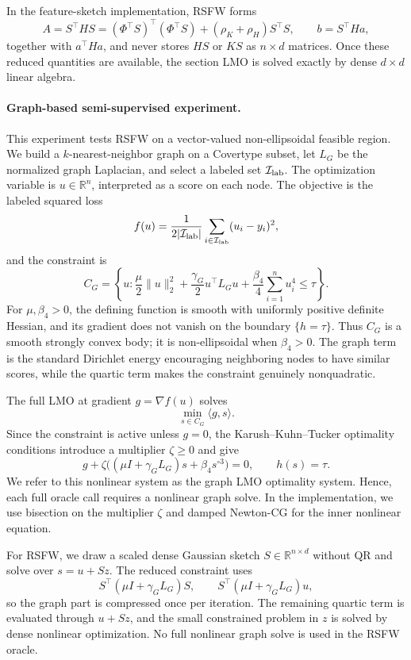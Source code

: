 \documentclass{article}
\begin{document}
In the feature-sketch implementation, RSFW forms
\[
    A=S^\top H S
     =
    (\Phi^\top S)^\top(\Phi^\top S)
    +(\rho_K+\rho_H)S^\top S,
    \qquad
    b=S^\top Ha,
\]
together with \(a^\top Ha\), and never stores \(HS\) or \(KS\) as
\(n\times d\) matrices. Once these reduced quantities are available, the section
LMO is solved exactly by dense \(d\times d\) linear algebra.

\paragraph{Graph-based semi-supervised experiment.}
This experiment tests RSFW on a vector-valued non-ellipsoidal feasible region.
We build a \(k\)-nearest-neighbor graph on a Covertype subset, let \(L_G\) be the
normalized graph Laplacian, and select a labeled set \(\mathcal I_{\rm lab}\). The
optimization variable is \(u\in\mathbb R^n\), interpreted as a score on each
node. The objective is the labeled squared loss
\[
    f(u)=\frac{1}{2|\mathcal I_{\rm lab}|}
    \sum_{i\in\mathcal I_{\rm lab}}(u_i-y_i)^2,
\]
and the constraint is
\[
    C_G=
    \left\{
    u:
    \frac{\mu}{2}\|u\|_2^2
    +\frac{\gamma_G}{2}u^\top L_Gu
    +\frac{\beta_4}{4}\sum_{i=1}^n u_i^4
    \le \tau
    \right\}.
\]
For \(\mu,\beta_4>0\), the defining function is smooth with uniformly positive
definite Hessian, and its gradient does not vanish on the boundary
\(\{h=\tau\}\). Thus \(C_G\) is a smooth strongly convex body; it is
non-ellipsoidal when \(\beta_4>0\). The graph term is the standard Dirichlet
energy encouraging neighboring nodes to have similar scores, while the quartic
term makes the constraint genuinely nonquadratic.


The full LMO at gradient \(g=\nabla f(u)\) solves
\[
    \min_{s\in C_G}\langle g,s\rangle .
\]
Since the constraint is active unless \(g=0\), the Karush--Kuhn--Tucker
optimality conditions introduce a multiplier \(\zeta\ge0\) and give
\[
    g+\zeta\big((\mu I+\gamma_G L_G)s+\beta_4s^{\circ 3}\big)=0,
    \qquad h(s)=\tau .
\]
We refer to this nonlinear system as the graph LMO optimality system. Hence, each full oracle call requires a nonlinear graph solve. In the
implementation, we use bisection on the multiplier \(\zeta\) and damped
Newton-CG for the inner nonlinear equation.

For RSFW, we draw a scaled dense Gaussian sketch
\(S\in\mathbb R^{n\times d}\) without QR and solve over \(s=u+Sz\). The reduced
constraint uses
\[
    S^\top(\mu I+\gamma_G L_G)S,
    \qquad
    S^\top(\mu I+\gamma_G L_G)u,
\]
so the graph part is compressed once per iteration. The remaining quartic term
is evaluated through \(u+Sz\), and the small constrained problem in \(z\) is
solved by dense nonlinear optimization. No full nonlinear graph solve is used in
the RSFW oracle.
\end{document}
